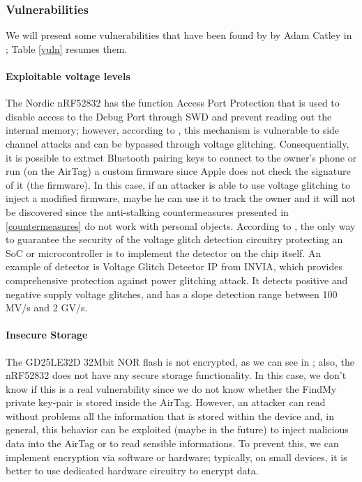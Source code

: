 \documentclass[english]{article}
\begin{document}
\subsubsection{Vulnerabilities}\label{sec:vuln}
We will present some vulnerabilities that have been found by by Adam Catley in \cite{reverse}; Table \ref{vuln} resumes them.
\paragraph{Exploitable voltage levels}
The Nordic nRF52832 has the function Access Port Protection \cite{nordicsemi} that is used to disable access to the Debug Port through SWD and prevent reading out the internal memory; however, according to \cite{side}, this mechanism is vulnerable to side channel attacks and can be bypassed through voltage glitching. Consequentially, it is possible to extract Bluetooth pairing keys to connect to the owner’s phone or run (on the AirTag) a custom firmware since Apple does not check the signature of it (the firmware). In this case, if an attacker is able to use voltage glitching to inject a modified firmware, maybe he can use it to track the owner and it will not be discovered since the anti-stalking countermeasures presented in \ref{countermeasures} do not work with personal objects. According to \cite{voltage}, the only way to guarantee the security of the voltage glitch detection circuitry protecting an SoC or microcontroller is to implement the detector on the chip itself. An example of detector is Voltage Glitch Detector IP from INVIA, which provides comprehensive protection against power glitching attack. It detects positive and negative supply voltage glitches, and has a slope detection range between 100 MV/s and 2 GV/s.

\paragraph{Insecure Storage}The GD25LE32D 32Mbit NOR flash is not encrypted, as we can see in \cite{tweet}; also, the nRF52832 does not have any secure storage functionality. In this case, we don't know if this is a real vulnerability since we do not know whether the FindMy private key-pair is stored inside the AirTag. However, an attacker can read without problems all the information that is stored within the device and, in general, this behavior can be exploited (maybe in the future) to inject malicious data into the AirTag or to read sensible informations. To prevent this, we can implement encryption via software or hardware; typically, on small devices, it is better to use dedicated hardware circuitry to encrypt data.
\end{document}
